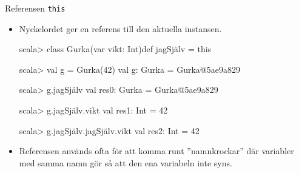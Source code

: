 \begin{Slide}{Referensen \texttt{this}}\SlideFontSmall
\begin{itemize}
\item Nyckelordet  ger en referens till den aktuella instansen.
\begin{REPLnonum}
scala> class Gurka(var vikt: Int){def jagSjälv = this}

scala> val g = Gurka(42)
val g: Gurka = Gurka@5ae9a829

scala> g.jagSjälv
val res0: Gurka = Gurka@5ae9a829

scala> g.jagSjälv.vikt
val res1: Int = 42

scala> g.jagSjälv.jagSjälv.vikt
val res2: Int = 42
\end{REPLnonum}
\item Referensen  används ofta för att komma runt ''namnkrockar'' där variabler med samma namn gör så att den ena variabeln inte syns.
\end{itemize}
\end{Slide}




